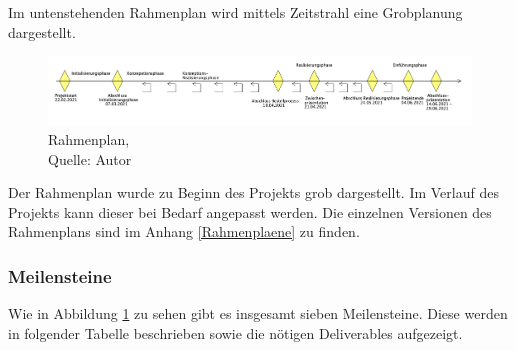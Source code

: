 Im untenstehenden Rahmenplan wird mittels Zeitstrahl eine Grobplanung dargestellt. 

\begin{figure}[H]
    \centering
   \includegraphics[width=1\textwidth]{images/SoDa_Zeitstrahl.png}
    \caption[SoDa Rahmenplan]{Rahmenplan,\\ Quelle: Autor}
    \label{img: SoDa Rahmenplan}
\end{figure}
Der Rahmenplan wurde zu Beginn des Projekts grob dargestellt. Im Verlauf des Projekts kann dieser bei Bedarf angepasst werden. Die einzelnen Versionen des Rahmenplans sind im Anhang \ref{Rahmenplaene} zu finden. 
\newpage

\subsubsection{Meilensteine}\label{Meilensteine}
Wie in Abbildung \ref{img: SoDa Rahmenplan} zu sehen gibt es insgesamt sieben Meilensteine.
Diese werden in folgender Tabelle beschrieben sowie die nötigen Deliverables aufgezeigt.


